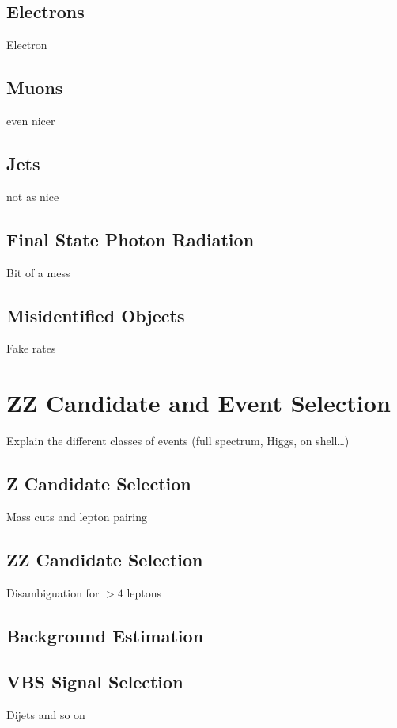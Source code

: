 \subsection{Electrons}

Electron


\subsection{Muons}
even nicer


\subsection{Jets}
not as nice


\subsection{Final State Photon Radiation}
Bit of a mess


\subsection{Misidentified Objects}\label{sec:looseID}
Fake rates



\section{ZZ Candidate and Event Selection}
Explain the different classes of events (full spectrum, Higgs, on shell\ldots)

\subsection{Z Candidate Selection}\label{sec:zSelection}
Mass cuts and lepton pairing


\subsection{ZZ Candidate Selection}
Disambiguation for $>4$ leptons


\subsection{Background Estimation}


\subsection{VBS Signal Selection}\label{sec:vbsSelection}
Dijets and so on
